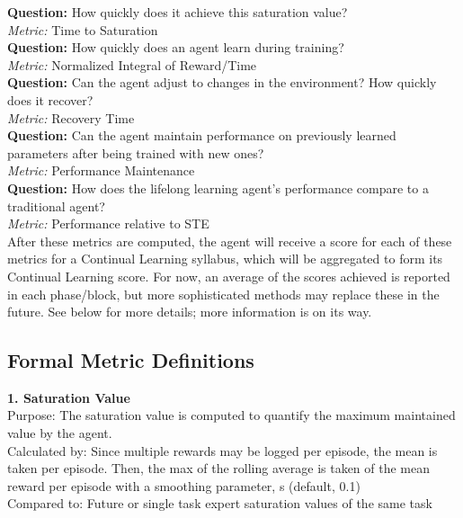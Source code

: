 \textbf{Question:} How quickly does it achieve this saturation value?\\
\textit{Metric:} Time to Saturation\\[0.1in]

\textbf{Question:} How quickly does an agent learn during training?\\
\textit{Metric:} Normalized Integral of Reward/Time\\[0.1in]


\textbf{Question:} Can the agent adjust to changes in the environment? How quickly does it recover?\\
\textit{Metric:} Recovery Time\\[0.1in]


\textbf{Question:} Can the agent maintain performance on previously learned parameters after being trained with new ones?\\
\textit{Metric:} Performance Maintenance\\[0.1in]


\textbf{Question:} How does the lifelong learning agent's performance compare to a traditional agent?\\
\textit{Metric:} Performance relative to STE \\[0.2in]
            
            

After these metrics are computed, the agent will receive a score for  each of these metrics for a Continual Learning syllabus, which will be aggregated to form its Continual Learning score. For now, an average of the scores achieved is reported in each phase/block, but more sophisticated methods may replace these in the future. See below for more details; more information is on its way.
    


\subsection*{Formal Metric Definitions}

\textbf{1. Saturation Value}\\
Purpose: The saturation value is computed to quantify the maximum maintained value by the agent.\\
Calculated by: Since multiple rewards may be logged per episode, the mean is taken per episode. Then, the max of the rolling average is taken of the mean reward per episode with a smoothing parameter, s (default, 0.1)\\
Compared to: Future or single task expert saturation values of the same task\\[0.1in]         


